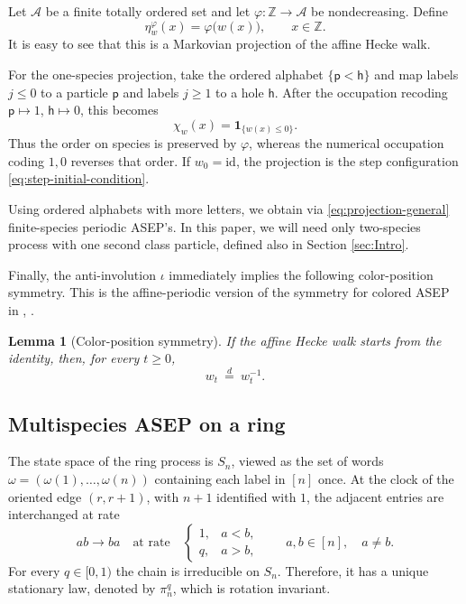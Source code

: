 \documentclass[11pt,a4paper]{amsart}
\newtheorem{lemma}[theorem]{Lemma}
\theoremstyle{definition}
\theoremstyle{remark}
\numberwithin{equation}{section}
\newcommand{\Z}{\mathbb Z}
\newcommand{\one}{\mathbf 1}
\newcommand{\id}{\mathrm{id}}
\begin{document}
	Let $\mathcal A$ be a finite totally ordered set and let
	$\varphi:\Z\to\mathcal A$ be nondecreasing.  Define
	\begin{equation}\label{eq:projection-general}
		\eta_w^{\varphi}(x)=\varphi\bigl(w(x)\bigr),
		\qquad x\in\Z.
	\end{equation}
	It is easy to see that this is a Markovian projection of the affine Hecke walk.  
	
	For the one-species projection, take the ordered alphabet
	$\{\mathsf p<\mathsf h\}$ and map labels $j\le0$ to a particle $\mathsf p$
	and labels $j\ge1$ to a hole $\mathsf h$.  After the occupation
	recoding $\mathsf p\mapsto1$, $\mathsf h\mapsto0$, this becomes
	\begin{equation}\label{eq:one-species-projection}
		\chi_w(x)=\one_{\{w(x)\le0\}}.
	\end{equation}
	Thus the order on species is preserved by $\varphi$, whereas the numerical
	occupation coding $1,0$ reverses that order.  If $w_0=\id$, the projection
	is the step configuration \eqref{eq:step-initial-condition}.
	
	Using ordered alphabets with more letters, we obtain via \eqref{eq:projection-general} finite-species periodic ASEP's. In this paper, we will need only two-species process with one second class particle, defined also in Section \ref{sec:Intro}. 
	
	Finally, the anti-involution $\iota$ immediately implies the following
	color-position symmetry.  This is the affine-periodic version of the
	symmetry for colored ASEP in \cite{BorodinBufetovColorPosition}, \cite{BufetovHecke}.
	
	\begin{lemma}[Color-position symmetry]\label{lem:color-position-symmetry}
		If the affine Hecke walk starts from the identity, then, for every $t\ge0$,
		\begin{equation}\label{eq:fixed-time-inversion-symmetry}
			w_t\ \stackrel{d}{=}\ w_t^{-1}.
		\end{equation}
	\end{lemma}
	
	\subsection{Multispecies ASEP on a ring}\label{subsec:ring-asep}
	
	The state space of the ring process is $S_n$, viewed as the set of words
	$\omega=(\omega(1),\ldots,\omega(n))$ containing each label in $[n]$ once.
	At the clock of the oriented edge $(r,r+1)$, with $n+1$ identified with $1$,
	the adjacent entries are interchanged at rate
	\begin{equation}\label{eq:ring-rates}
		ab\longrightarrow ba
		\quad\text{at rate}\quad
		\begin{cases}
			1,&a<b,\\
			q,&a>b,
		\end{cases}
		\qquad a,b\in[n],\quad a\ne b.
	\end{equation}
	For every $q\in[0,1)$ the chain is irreducible on $S_n$. Therefore, it has a unique stationary law,
	denoted by $\pi_n^q$, which is rotation invariant. 
	
\end{document}
